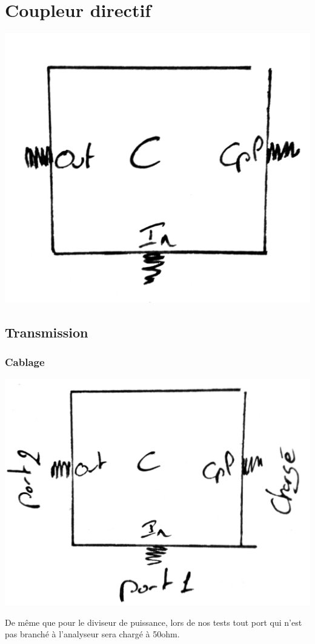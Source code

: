 \documentclass[a4paper,12pt]{report}            %
\begin{document}
\chapter{Coupleur directif}
\begin{center}\includegraphics[scale = 0.17]{pic/CD.png}\\ \end{center}

\section{Transmission}
\subsection{Cablage}
\begin{center}\includegraphics[scale = 0.17]{pic/CDIO.png}\\ \end{center}
De même que pour le diviseur de puissance, lors de nos tests tout port qui n'est pas branché
à l'analyseur sera chargé à 50ohm.
\newpage
\end{document}
